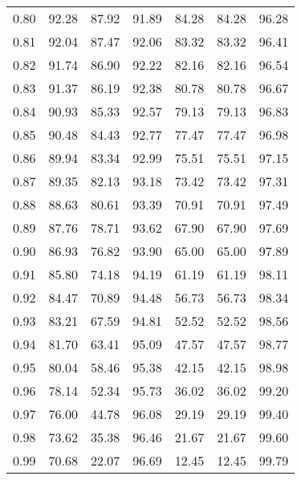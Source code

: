 \begin{tabular}{|c|c|c|c|c|c|c|}
      0.80 &     92.28 &     87.92 &      91.89 &   84.28 &      84.28 &         96.28 \\
      0.81 &     92.04 &     87.47 &      92.06 &   83.32 &      83.32 &         96.41 \\
      0.82 &     91.74 &     86.90 &      92.22 &   82.16 &      82.16 &         96.54 \\
      0.83 &     91.37 &     86.19 &      92.38 &   80.78 &      80.78 &         96.67 \\
      0.84 &     90.93 &     85.33 &      92.57 &   79.13 &      79.13 &         96.83 \\
      0.85 &     90.48 &     84.43 &      92.77 &   77.47 &      77.47 &         96.98 \\
      0.86 &     89.94 &     83.34 &      92.99 &   75.51 &      75.51 &         97.15 \\
      0.87 &     89.35 &     82.13 &      93.18 &   73.42 &      73.42 &         97.31 \\
      0.88 &     88.63 &     80.61 &      93.39 &   70.91 &      70.91 &         97.49 \\
      0.89 &     87.76 &     78.71 &      93.62 &   67.90 &      67.90 &         97.69 \\
      0.90 &     86.93 &     76.82 &      93.90 &   65.00 &      65.00 &         97.89 \\
      0.91 &     85.80 &     74.18 &      94.19 &   61.19 &      61.19 &         98.11 \\
      0.92 &     84.47 &     70.89 &      94.48 &   56.73 &      56.73 &         98.34 \\
      0.93 &     83.21 &     67.59 &      94.81 &   52.52 &      52.52 &         98.56 \\
      0.94 &     81.70 &     63.41 &      95.09 &   47.57 &      47.57 &         98.77 \\
      0.95 &     80.04 &     58.46 &      95.38 &   42.15 &      42.15 &         98.98 \\
      0.96 &     78.14 &     52.34 &      95.73 &   36.02 &      36.02 &         99.20 \\
      0.97 &     76.00 &     44.78 &      96.08 &   29.19 &      29.19 &         99.40 \\
      0.98 &     73.62 &     35.38 &      96.46 &   21.67 &      21.67 &         99.60 \\
      0.99 &     70.68 &     22.07 &      96.69 &   12.45 &      12.45 &         99.79 \\
\bottomrule
\end{tabular}
